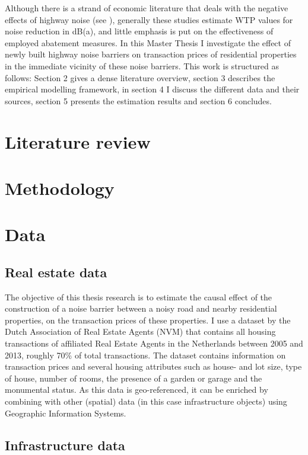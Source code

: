 \documentclass[]{scrartcl}
\begin{document}
Although there is a strand of economic literature that deals with the negative effects of highway noise (see \cite{Nelson1982,Nelson2008,Bateman1993}), generally these studies estimate WTP values for noise reduction in dB(a), and little emphasis is put on the effectiveness of employed abatement measures. In this Master Thesis I investigate the effect of newly built highway noise barriers on transaction prices of residential properties in the immediate vicinity of these noise barriers. This work is structured as follows: Section 2 gives a dense literature overview, section 3 describes the empirical modelling framework, in section 4 I discuss the different data and their sources, section 5 presents the estimation results and section 6 concludes.

\section{Literature review}



\section{Methodology}

\section{Data}

\subsection{Real estate data}

The objective of this thesis research is to estimate the causal effect of the construction of a noise barrier between a noisy road and nearby residential properties, on the transaction prices of these properties. I use a dataset by the Dutch Association of Real Estate Agents (NVM) that contains all housing transactions of affiliated Real Estate Agents in the Netherlands between 2005 and 2013, roughly 70\% of total transactions. The dataset contains information on transaction prices and several housing attributes such as house- and lot size, type of house, number of rooms, the presence of a garden or garage and the monumental status. As this data is geo-referenced, it can be enriched by combining with other (spatial) data (in this case infrastructure objects) using Geographic Information Systems.

\subsection{Infrastructure data}
\end{document}
